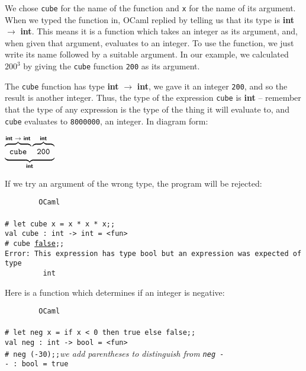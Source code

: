 \documentclass[]{book}
\newcommand{\smspace}{\vspace{4mm}}
\begin{document}
\noindent We chose \texttt{cube} for the name of the function and \texttt{x} for the name of its argument. When we typed the function in, OCaml replied by telling us that its type is \index{$\rightarrow$}\textsf{\textbf{int} $\rightarrow$ \textbf{int}}. This means it is a function which takes an integer as its argument, and, when given that argument, evaluates to an integer. To use the function, we just write its name followed by a suitable argument. In our example, we calculated $200^3$ by giving the \texttt{cube} function \texttt{200} as its argument.

The \texttt{cube} function has type \textsf{\textbf{int} $\rightarrow$ \textbf{int}}, we gave it an integer \texttt{200}, and so the result is another integer. Thus, the type of the expression \texttt{cube\!} is \textbf{\textsf{int}} -- remember that the type of any expression is the type of the thing it will evaluate to, and \texttt{cube\!} evaluates to \texttt{8000000}, an integer. In diagram form:

\smspace
$\underbrace{\overbrace{\texttt{\strut  \ cube   }}^{\textbf{\textsf{int $\rightarrow$ int}}} \overbrace{\texttt{\strut \  200   }}^{\textbf{\textsf{int}}}}_{\textsf{\textbf{int}}}$
\smspace

\noindent If we try an argument of the wrong type, the program will be rejected:

\smspace
\noindent\verb!        OCaml!\\
\noindent\\
\noindent\verb!# let cube x = x * x * x;;!\\
\noindent\verb!val cube : int -> int = <fun>!\\
\noindent\texttt{\# cube \underline{\vphantom{i}false};;}\\
\noindent\verb!Error: This expression has type bool but an expression was expected of type!\\
\noindent\verb!         int!
\smspace

\noindent Here is a function which determines if an integer is negative:

\smspace
\noindent\verb!        OCaml!\\
\noindent\\
\noindent\verb!# let neg x = if x < 0 then true else false;;!\\
\noindent\verb!val neg : int -> bool = <fun>!\\
\noindent\texttt{\# neg (-30);;}\hfill\textit{we add parentheses to distinguish from \texttt{neg\!\! -\!}}\\
\noindent\verb!- : bool = true!
\smspace
\end{document}
